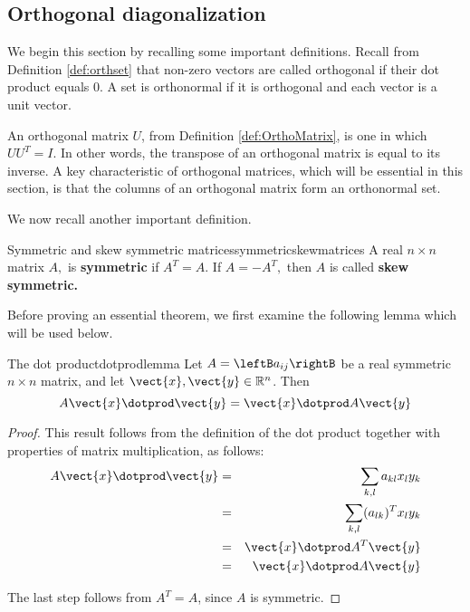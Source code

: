 \subsection{Orthogonal diagonalization}

We begin this section by recalling some important definitions. Recall from Definition \ref{def:orthset} that non-zero vectors are called orthogonal if their dot product equals $0$.  A set is orthonormal if it is orthogonal and each vector is a unit vector. 

An orthogonal matrix $U$, from Definition \ref{def:OrthoMatrix}, is one in which $UU^{T} = I$. In other words, the transpose of an orthogonal matrix is equal to its inverse. A key characteristic of orthogonal matrices, which will be essential in this section, is that the columns of an orthogonal matrix form an orthonormal set. 

We now recall another important definition. 

\begin{definition}{Symmetric and skew symmetric matrices}{symmetricskewmatrices}
A real $n\times n$ matrix $A,$ is \textbf{symmetric }if $A^{T}=A.$ If $%
A=-A^{T},$ then $A$ is called \textbf{skew symmetric. }
\end{definition}

Before proving an essential theorem, we first examine the following lemma which will be used below.

\begin{lemma}{The dot product}{dotprodlemma}
Let $A=\leftB a_{ij} \rightB$ be a real symmetric $n \times n$ matrix, and let $\vect{x}, \vect{y} \in \mathbb{R}^n$. Then
\[
A\vect{x} \dotprod \vect{y} = \vect{x} \dotprod A \vect{y}
\]
\end{lemma}

\begin{proof}
This result follows from the definition of the dot product together with properties of matrix multiplication, as follows:
\begin{eqnarray*}
A\vect{x} \dotprod \vect{y} &=& \sum_{k,l}a_{kl}x_{l}y_{k} \\
&=&\sum_{k,l} (a_{lk})^Tx_{l}y_{k} \\
&=& \vect{x}\dotprod A^{T}\vect{y} \\
&=& \vect{x}\dotprod A \vect{y}
\end{eqnarray*}

The last step follows from $A^T = A$, since $A$ is symmetric. 
\end{proof}

